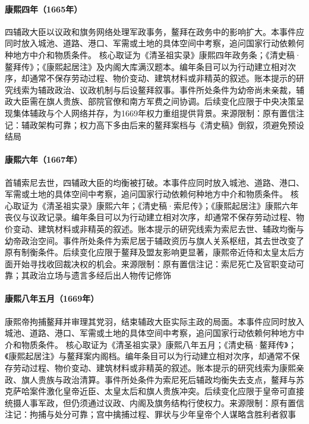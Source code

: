 \hypertarget{civic:EQ-1665-REGENTS-CONSOLIDATION}{}\paragraph{康熙四年（1665年）}四辅政大臣以议政和旗务网络处理军政事务，鳌拜在政务中的影响扩大。本事件应同时放入城池、道路、港口、军需或土地的具体空间中考察，追问国家行动依赖何种地方中介和物质条件。 核心取证为《清圣祖实录》康熙四年政务条；《清史稿·鳌拜传》；《康熙起居注》及内阁大库满汉题本。编年条目可以为行动建立相对次序，却通常不保存劳动过程、物价变动、建筑材料或非精英的叙述。账本提示的研究线索为辅政政治、议政机制与后设鳌拜叙事。事件所处条件为幼帝尚未亲裁，辅政大臣需在旗人贵族、部院官僚和南方军费之间协调。后续变化应限于中央决策呈现集体辅政与个人网络并存，为1669年权力重组提供背景。来源限制：原有置信注记：辅政架构可靠；权力高下多由后来的鳌拜案档与《清史稿》倒叙，须避免预设结局
\hypertarget{civic:EQ-1667-SONI-DEATH}{}\paragraph{康熙六年（1667年）}首辅索尼去世，四辅政大臣的均衡被打破。本事件应同时放入城池、道路、港口、军需或土地的具体空间中考察，追问国家行动依赖何种地方中介和物质条件。 核心取证为《清圣祖实录》康熙六年；《清史稿·索尼传》；《康熙起居注》康熙六年丧仪与议政记录。编年条目可以为行动建立相对次序，却通常不保存劳动过程、物价变动、建筑材料或非精英的叙述。账本提示的研究线索为索尼去世、辅政均衡与幼帝政治空间。事件所处条件为索尼居于辅政资历与旗人关系枢纽，其去世改变了原有制衡条件。后续变化应限于鳌拜及盟友影响更显著，康熙帝近侍和太皇太后方面开始寻找收回裁决权的机会。来源限制：原有置信注记：索尼死亡及官职变动可靠；其政治立场与遗言多经后出人物传记修饰
\hypertarget{civic:EQ-1669-OBOI-ARREST}{}\paragraph{康熙八年五月（1669年）}康熙帝拘捕鳌拜并审理其党羽，结束辅政大臣实际主政的局面。本事件应同时放入城池、道路、港口、军需或土地的具体空间中考察，追问国家行动依赖何种地方中介和物质条件。 核心取证为《清圣祖实录》康熙八年五月；《清史稿·鳌拜传》；《康熙起居注》与鳌拜案内阁档。编年条目可以为行动建立相对次序，却通常不保存劳动过程、物价变动、建筑材料或非精英的叙述。账本提示的研究线索为康熙亲政、旗人贵族与政治清算。事件所处条件为索尼死后辅政均衡失去支点，鳌拜与苏克萨哈案件激化皇帝近臣、太皇太后和旗人贵族冲突。后续变化应限于皇帝可直接统摄人事军政，但仍须通过议政、内阁及旗务结构行使权力。来源限制：原有置信注记：拘捕与处分可靠；宫中擒捕过程、罪状与少年皇帝个人谋略含胜利者叙事
